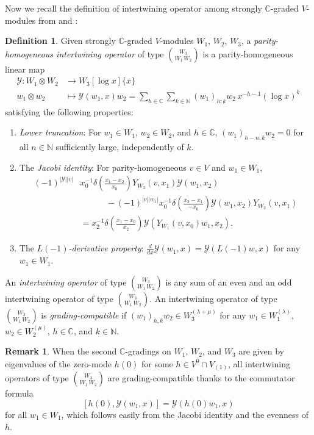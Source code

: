 \documentclass[11pt, reqno]{amsart}
\theoremstyle{definition}\newtheorem{defi}[thm]{Definition}
\theoremstyle{definition}\newtheorem{rem}[thm]{Remark}
\theoremstyle{definition}\newtheorem{exam}[thm]{Example}
\theoremstyle{definition}\newtheorem{assum}[thm]{Assumption}
\newcommand{\cY}{\mathcal{Y}}
\newcommand{\CC}{\mathbb{C}}
\newcommand{\NN}{\mathbb{N}}
\newcommand{\even}{\overline{0}}
\begin{document}
Now we recall the definition of intertwining operator among strongly $\CC$-graded $V$-modules from \cite[Definition 3.10 and 3.14]{HLZ2} and \cite[Definition 3.7]{CKM-exts}:
\begin{defi}
Given strongly $\CC$-graded $V$-modules $W_1$, $W_2$, $W_3$, a \textit{parity-homogeneous intertwining operator} of type $\binom{W_3}{W_1\,W_2}$ is a parity-homogeneous linear map
\begin{align*}
\cY: W_1\otimes W_2 & \rightarrow W_3[\log x]\lbrace x\rbrace\nonumber\\
w_1\otimes w_2 & \mapsto \cY(w_1,x)w_2=\sum_{h\in\CC}\sum_{k\in\NN} (w_1)_{h;k} w_2\,x^{-h-1}(\log x)^k
\end{align*}
satisfying the following properties:
\begin{enumerate}
\item \textit{Lower truncation}: For $w_1\in W_1$, $w_2\in W_2$, and $h\in\CC$, $(w_1)_{h-n,k} w_2 = 0$
for all $n\in\NN$ sufficiently large, independently of $k$.

\item The \textit{Jacobi identity}: For parity-homogeneous $v\in V$ and $w_1\in W_1$,
\begin{align*}
(-1)^{\vert\cY\vert\vert v\vert} & x_0^{-1}  \delta\left(\frac{x_1-x_2}{x_0}\right) Y_{W_3}(v,x_1)\cY(w_1,x_2)\nonumber\\
&\hspace{3em} - (-1)^{\vert v\vert\vert w_1\vert} x_0^{-1}\delta\left(\frac{x_2-x_1}{-x_0}\right) \cY(w_1,x_2)Y_{W_2}(v,x_1)\nonumber\\
& = x_2^{-1}\delta\left(\frac{x_1-x_0}{x_2}\right) \cY(Y_{W_1}(v,x_0)w_1,x_2).
\end{align*}

\item The \textit{$L(-1)$-derivative property}: $\frac{d}{dx}\cY(w_1,x)=\cY(L(-1)w,x)$ for any $w_1\in W_1$.
\end{enumerate}
An \textit{intertwining operator} of type $\binom{W_3}{W_1\,W_2}$ is any sum of an even and an odd intertwining operator of type $\binom{W_3}{W_1\,W_2}$. An intertwining operator of type $\binom{W_3}{W_1\,W_2}$ is \textit{grading-compatible} if $(w_1)_{h,k}w_2\in W_3^{(\lambda+\mu)}$ for any $w_1\in W_1^{(\lambda)}$, $w_2\in W_2^{(\mu)}$, $h\in\CC$, and $k\in\NN$.
\end{defi}

\begin{rem}
When the second $\CC$-gradings on $W_1$, $W_2$, and $W_3$ are given by eigenvalues of the zero-mode $h(0)$ for some $h\in V^{\even}\cap V_{(1)}$, all intertwining operators of type $\binom{W_3}{W_1\,W_2}$ are grading-compatible thanks to the commutator formula
\begin{equation}\label{eqn:Y_compat_with_h(0)}
[h(0),\cY(w_1,x)] =\cY(h(0)w_1,x)
\end{equation}
for all $w_1\in W_1$, which follows easily from the Jacobi identity and the evenness of $h$.
\end{rem}
\end{document}
